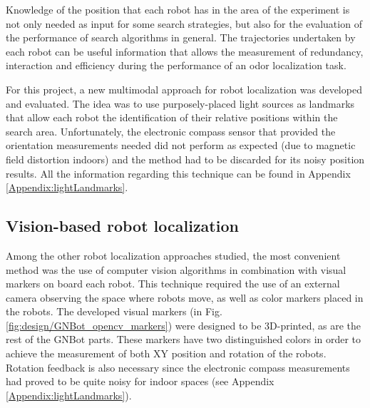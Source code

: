 \label{sect:realTimePositionMeasurement}

Knowledge of the position that each robot has in the area of the experiment is not only needed as input for some search strategies, but also for the evaluation of the performance of search algorithms in general. The trajectories undertaken by each robot can be useful information that allows the measurement of redundancy, interaction and efficiency during the performance of an odor localization task.

For this project, a new multimodal approach for robot localization was developed and evaluated. The idea was to use purposely-placed light sources as landmarks that allow each robot the identification of their relative positions within the search area. Unfortunately, the electronic compass sensor that provided the orientation measurements needed did not perform as expected (due to magnetic field distortion indoors) and the method had to be discarded for its noisy position results. All the information regarding this technique can be found in Appendix \ref{Appendix:lightLandmarks}.


\subsection{Vision-based robot localization}
\label{sect:visionBasedLocalization}

Among the other robot localization approaches studied, the most convenient method was the use of computer vision algorithms in combination with visual markers on board each robot.
This technique required the use of an external camera observing the space where robots move, as well as color markers placed in the robots.
The developed visual markers (in Fig. \ref{fig:design/GNBot_opencv_markers}) were designed to be 3D-printed, as are the rest of the GNBot parts.
These markers have two distinguished colors in order to achieve the measurement of both XY position and rotation of the robots.
Rotation feedback is also necessary since the electronic compass measurements had proved to be quite noisy for indoor spaces (see Appendix \ref{Appendix:lightLandmarks}).






